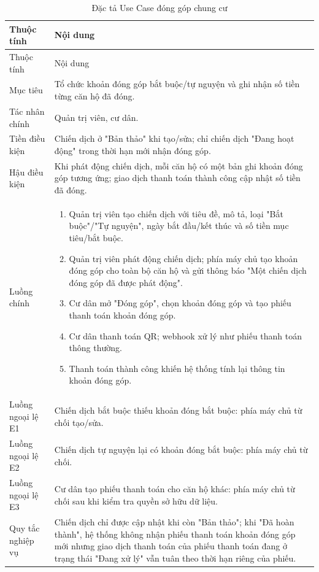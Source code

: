 ﻿\documentclass[12pt,a4paper]{report}
\begin{document}
\begin{longtable}{L{4cm} L{10.5cm}}
\caption{Đặc tả Use Case đóng góp chung cư}\label{tab:uc-contribution}\\
\toprule
Thuộc tính & Nội dung \\
\midrule
\endfirsthead
\toprule Thuộc tính & Nội dung \\\midrule
\endhead
Mục tiêu & Tổ chức khoản đóng góp bắt buộc/tự nguyện và ghi nhận số tiền từng căn hộ đã đóng. \\
Tác nhân chính & Quản trị viên, cư dân. \\
Tiền điều kiện & Chiến dịch ở "Bản thảo" khi tạo/sửa; chỉ chiến dịch "Đang hoạt động" trong thời hạn mới nhận đóng góp. \\
Hậu điều kiện & Khi phát động chiến dịch, mỗi căn hộ có một bản ghi khoản đóng góp tương ứng; giao dịch thanh toán thành công cập nhật số tiền đã đóng. \\
Luồng chính & \begin{enumerate}
\item Quản trị viên tạo chiến dịch với tiêu đề, mô tả, loại "Bắt buộc"/"Tự nguyện", ngày bắt đầu/kết thúc và số tiền mục tiêu/bắt buộc.
\item Quản trị viên phát động chiến dịch; phía máy chủ tạo khoản đóng góp cho toàn bộ căn hộ và gửi thông báo "Một chiến dịch đóng góp đã được phát động".
\item Cư dân mở "Đóng góp", chọn khoản đóng góp và tạo phiếu thanh toán khoản đóng góp.
\item Cư dân thanh toán QR; webhook xử lý như phiếu thanh toán thông thường.
\item Thanh toán thành công khiến hệ thống tính lại thông tin khoản đóng góp.
\end{enumerate} \\
Luồng ngoại lệ E1 & Chiến dịch bắt buộc thiếu khoản đóng bắt buộc: phía máy chủ từ chối tạo/sửa. \\
Luồng ngoại lệ E2 & Chiến dịch tự nguyện lại có khoản đóng bắt buộc: phía máy chủ từ chối. \\
Luồng ngoại lệ E3 & Cư dân tạo phiếu thanh toán cho căn hộ khác: phía máy chủ từ chối sau khi kiểm tra quyền sở hữu dữ liệu. \\
Quy tắc nghiệp vụ & Chiến dịch chỉ được cập nhật khi còn "Bản thảo"; khi "Đã hoàn thành", hệ thống không nhận phiếu thanh toán khoản đóng góp mới nhưng giao dịch thanh toán của phiếu thanh toán đang ở trạng thái "Đang xử lý" vẫn tuân theo thời hạn riêng của phiếu. \\
\bottomrule
\end{longtable}
\end{document}
